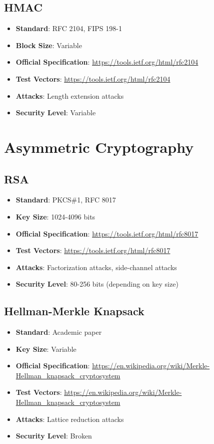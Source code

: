 \documentclass[11pt,a4paper]{article}
\begin{document}
\subsection{HMAC}
\begin{itemize}
    \item \textbf{Standard}: RFC 2104, FIPS 198-1
    \item \textbf{Block Size}: Variable
    \item \textbf{Official Specification}: \url{https://tools.ietf.org/html/rfc2104}
    \item \textbf{Test Vectors}: \url{https://tools.ietf.org/html/rfc2104}
    \item \textbf{Attacks}: Length extension attacks
    \item \textbf{Security Level}: Variable
\end{itemize}

\section{Asymmetric Cryptography}

\subsection{RSA}
\begin{itemize}
    \item \textbf{Standard}: PKCS\#1, RFC 8017
    \item \textbf{Key Size}: 1024-4096 bits
    \item \textbf{Official Specification}: \url{https://tools.ietf.org/html/rfc8017}
    \item \textbf{Test Vectors}: \url{https://tools.ietf.org/html/rfc8017}
    \item \textbf{Attacks}: Factorization attacks, side-channel attacks
    \item \textbf{Security Level}: 80-256 bits (depending on key size)
\end{itemize}

\subsection{Hellman-Merkle Knapsack}
\begin{itemize}
    \item \textbf{Standard}: Academic paper
    \item \textbf{Key Size}: Variable
    \item \textbf{Official Specification}: \url{https://en.wikipedia.org/wiki/Merkle-Hellman_knapsack_cryptosystem}
    \item \textbf{Test Vectors}: \url{https://en.wikipedia.org/wiki/Merkle-Hellman_knapsack_cryptosystem}
    \item \textbf{Attacks}: Lattice reduction attacks
    \item \textbf{Security Level}: Broken
\end{itemize}
\end{document}
